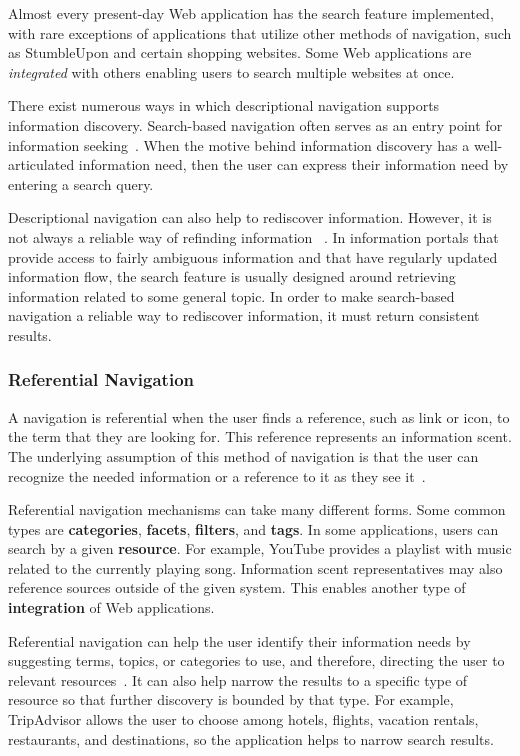 {{{Almost every present-day Web application has the search feature implemented, with rare exceptions of applications that utilize other methods of navigation, such as StumbleUpon and certain shopping websites. Some Web applications are \textit{integrated} with others enabling users to search multiple websites at once.    

There exist numerous ways in which descriptional navigation supports information discovery. Search-based navigation often serves as an entry point for information seeking~\cite{levene2011introduction}. When the motive behind information discovery has a well-articulated information need, then the user can express their information need by entering a search query. 

Descriptional navigation can also help to rediscover information. However, it is not always a reliable way of refinding information ~\cite{cockburn2003improving}. In information portals that provide access to fairly ambiguous information and that have regularly updated information flow, the search feature is usually designed around retrieving information related to some general topic. In order to make search-based navigation a reliable way to rediscover information, it must return consistent results. 
} %

{\subsubsection{Referential Navigation}
A navigation is referential when the user finds a reference, such as link or icon, to the term that they are looking for. This reference represents an information scent. The underlying assumption of this method of navigation is that the user can recognize the needed information or a reference to it as they see it~\cite{waterworth1991model}. 

Referential navigation mechanisms can take many different forms. Some common types are \textbf{categories}, \textbf{facets}, \textbf{filters}, and \textbf{tags}. In some applications, users can search by a given \textbf{resource}. For example, YouTube provides a playlist with music related to the currently playing song. Information scent representatives may also reference sources outside of the given system. This enables another type of \textbf{integration} of Web applications. 

Referential navigation can help the user identify their information needs by suggesting terms, topics, or categories to use, and therefore, directing the user to relevant resources~\cite{levene2011introduction}. It can also help narrow the results to a specific type of resource so that further discovery is bounded by that type. For example, TripAdvisor allows the user to choose among hotels, flights, vacation rentals, restaurants, and destinations, so the application helps to narrow search results.

}}}
